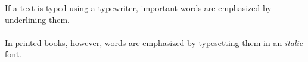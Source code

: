 \documentclass{article}
\begin{document}
If a text is typed using a typewriter, important words are emphasized by \underline{underlining} them.\\\\
In printed books, however, words are emphasized by typesetting them in an \emph{italic} font.\\\\
\end{document}
